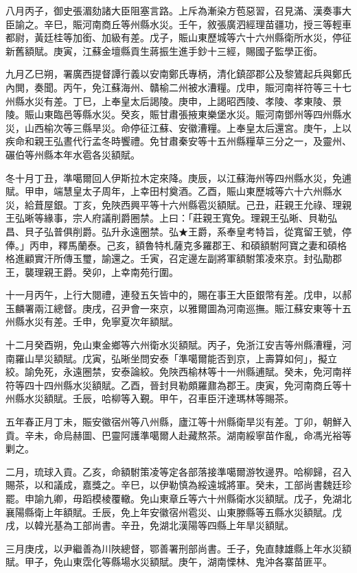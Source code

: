\begin{pinyinscope}
八月丙子，御史張湄劾諸大臣阻塞言路。上斥為漸染方苞惡習，召見滿、漢奏事大臣諭之。辛巳，賑河南商丘等州縣水災。壬午，敘張廣泗經理苗疆功，授三等輕車都尉，黃廷桂等加銜、加級有差。戊子，賑山東歷城等六十六州縣衛所水災，停征新舊額賦。庚寅，江蘇金壇縣貢生蔣振生進手鈔十三經，賜國子監學正銜。

九月乙巳朔，署廣西提督譚行義以安南鄭氏專柄，清化鎮邵郡公及黎鷟起兵與鄭氏內閧，奏聞。丙午，免江蘇海州、贛榆二州被水漕糧。戊申，賑河南祥符等三十七州縣水災有差。丁巳，上奉皇太后謁陵。庚申，上謁昭西陵、孝陵、孝東陵、景陵。賑山東臨邑等縣水災。癸亥，賑甘肅張掖東樂堡水災。賑河南鄧州等四州縣水災，山西榆次等三縣旱災。命停征江蘇、安徽漕糧。上奉皇太后還宮。庚午，上以疾命和親王弘晝代行孟冬時饗禮。免甘肅秦安等十五州縣糧草三分之一，及靈州、碾伯等州縣本年水雹各災額賦。

冬十月丁丑，準噶爾回人伊斯拉木定來降。庚辰，以江蘇海州等四州縣水災，免逋賦。甲申，端慧皇太子周年，上幸田村奠酒。乙酉，賑山東歷城等六十六州縣水災，給葺屋銀。丁亥，免陜西興平等十六州縣雹災額賦。己丑，莊親王允祿、理親王弘晰等緣事，宗人府議削爵圈禁。上曰：「莊親王寬免。理親王弘晰、貝勒弘昌、貝子弘普俱削爵。弘升永遠圈禁。弘★王爵，系奉皇考特旨，從寬留王號，停俸。」丙申，釋馬蘭泰。己亥，額魯特札薩克多羅郡王、和碩額駙阿寶之妻和碩格格進顧實汗所傳玉璽，諭還之。壬寅，召定邊左副將軍額駙策凌來京。封弘勩郡王，襲理親王爵。癸卯，上幸南苑行圍。

十一月丙午，上行大閱禮，連發五矢皆中的，賜在事王大臣銀幣有差。戊申，以郝玉麟署兩江總督。庚戌，召尹會一來京，以雅爾圖為河南巡撫。賑江蘇安東等十五州縣水災有差。壬申，免寧夏次年額賦。

十二月癸酉朔，免山東金鄉等六州衛水災額賦。丙子，免浙江安吉等州縣漕糧，河南羅山旱災額賦。戊寅，弘晰坐問安泰「準噶爾能否到京，上壽算如何」，擬立絞。諭免死，永遠圈禁，安泰論絞。免陜西榆林等十一州縣逋賦。癸未，免河南祥符等四十四州縣水災額賦。乙酉，晉封貝勒頗羅鼐為郡王。庚寅，免河南商丘等十州縣水災額賦。壬辰，哈柳等入覲。甲午，召車臣汗達瑪林等賜茶。

五年春正月丁未，賑安徽宿州等八州縣，廬江等十州縣衛旱災有差。丁卯，朝鮮入貢。辛未，命烏赫圖、巴靈阿護準噶爾人赴藏熬茶。湖南綏寧苗作亂，命馮光裕等剿之。

二月，琉球入貢。乙亥，命額駙策凌等定各部落接準噶爾游牧邊界。哈柳歸，召入賜茶，以和議成，嘉獎之。辛巳，以伊勒慎為綏遠城將軍。癸未，工部尚書魏廷珍罷。申諭九卿，毋蹈模棱覆轍。免山東章丘等六十州縣衛水災額賦。戊子，免湖北襄陽縣衛上年額賦。壬辰，免上年安徽宿州雹災、山東滕縣等五縣水災額賦。戊戌，以韓光基為工部尚書。辛丑，免湖北漢陽等四縣上年旱災額賦。

三月庚戌，以尹繼善為川陜總督，鄂善署刑部尚書。壬子，免直隸雄縣上年水災額賦。甲子，免山東霑化等縣場水災額賦。庚午，湖南慄林、鬼沖各寨苗匪平。


\end{pinyinscope}
